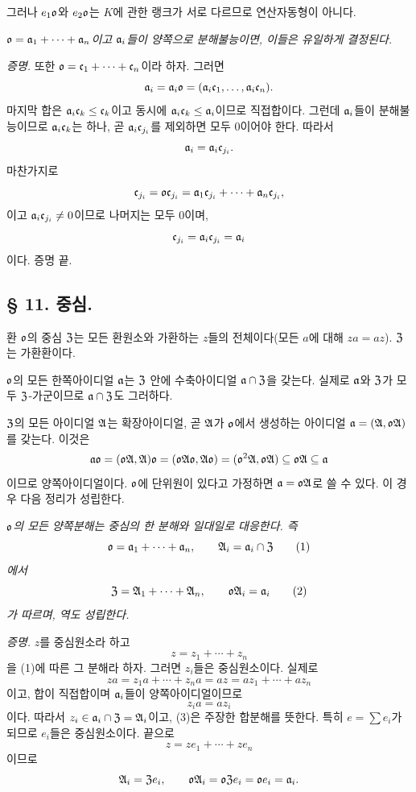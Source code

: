 그러나 \(e_1\mathfrak o\)와 \(e_2\mathfrak o\)는 \(K\)에 관한 랭크가 서로 다르므로 연산자동형이 아니다.

\emph{\(\mathfrak o=\mathfrak{a}_1+\cdots+\mathfrak{a}_n\)이고 \(\mathfrak{a}_i\)들이 양쪽으로 분해불능이면, 이들은 유일하게 결정된다.}

\emph{증명.} 또한 \(\mathfrak o=\mathfrak c_1+\cdots+\mathfrak c_n\)이라 하자. 그러면
\[
        \mathfrak{a}_i=\mathfrak{a}_i\mathfrak o=(\mathfrak{a}_i\mathfrak c_1,\ldots,\mathfrak{a}_i\mathfrak c_n).
\]
마지막 합은 \(\mathfrak{a}_i\mathfrak c_k\leq\mathfrak c_k\)이고 동시에 \(\mathfrak{a}_i\mathfrak c_k\leq\mathfrak{a}_i\)이므로 직접합이다. 그런데 \(\mathfrak{a}_i\)들이 분해불능이므로 \(\mathfrak{a}_i\mathfrak c_k\)는 하나, 곧 \(\mathfrak{a}_i\mathfrak c_{j_i}\)를 제외하면 모두 0이어야 한다. 따라서
\[
        \mathfrak{a}_i=\mathfrak{a}_i\mathfrak c_{j_i}.
\]
마찬가지로
\[
        \mathfrak c_{j_i}=\mathfrak o\mathfrak c_{j_i}
        =\mathfrak{a}_1\mathfrak c_{j_i}+\cdots+\mathfrak{a}_n\mathfrak c_{j_i},
\]
이고 \(\mathfrak{a}_i\mathfrak c_{j_i}\ne0\)이므로 나머지는 모두 0이며,
\[
        \mathfrak c_{j_i}=\mathfrak{a}_i\mathfrak c_{j_i}=\mathfrak{a}_i
\]
이다. 증명 끝.

\subsection*{§ 11. 중심.}

환 \(\mathfrak o\)의 중심 \(\mathfrak Z\)는 모든 환원소와 가환하는 \(z\)들의 전체이다(모든 \(a\)에 대해 \(za=az\)). \(\mathfrak Z\)는 가환환이다.

\(\mathfrak o\)의 모든 한쪽아이디얼 \(\mathfrak{a}\)는 \(\mathfrak Z\) 안에 \glqq{}수축아이디얼\grqq{} \(\mathfrak{a}\cap\mathfrak Z\)을 갖는다. 실제로 \(\mathfrak{a}\)와 \(\mathfrak Z\)가 모두 \(\mathfrak Z\)-가군이므로 \(\mathfrak{a}\cap\mathfrak Z\)도 그러하다.

\(\mathfrak Z\)의 모든 아이디얼 \(\mathfrak A\)는 확장아이디얼, 곧 \(\mathfrak A\)가 \(\mathfrak o\)에서 생성하는 아이디얼 \(\mathfrak{a}=(\mathfrak A,\mathfrak o\mathfrak A)\)를 갖는다. 이것은
\[
        \mathfrak{a}\mathfrak o=(\mathfrak o\mathfrak A,\mathfrak A)\mathfrak o=(\mathfrak o\mathfrak A\mathfrak o,\mathfrak A\mathfrak o)
        =(\mathfrak o^2\mathfrak A,\mathfrak o\mathfrak A)\subseteq\mathfrak o\mathfrak A\subseteq\mathfrak{a}
\]
이므로 양쪽아이디얼이다. \(\mathfrak o\)에 단위원이 있다고 가정하면 \(\mathfrak{a}=\mathfrak o\mathfrak A\)로 쓸 수 있다. 이 경우 다음 정리가 성립한다.

\emph{\(\mathfrak o\)의 모든 양쪽분해는 중심의 한 분해와 일대일로 대응한다. 즉}
\begin{equation}
        \mathfrak o=\mathfrak{a}_1+\cdots+\mathfrak{a}_n,
        \qquad \mathfrak A_i=\mathfrak{a}_i\cap\mathfrak Z                         \tag{1}
\end{equation}
\emph{에서}
\begin{equation}
        \mathfrak Z=\mathfrak A_1+\cdots+\mathfrak A_n,
        \qquad \mathfrak o\mathfrak A_i=\mathfrak{a}_i                              \tag{2}
\end{equation}
\emph{가 따르며, 역도 성립한다.}

\emph{증명.} \(z\)를 중심원소라 하고
\begin{equation}
        z=z_1+\cdots+z_n                                    \tag{3}
\end{equation}
을 (1)에 따른 그 분해라 하자. 그러면 \(z_i\)들은 중심원소이다. 실제로
\[
        za=z_1a+\cdots+z_na=az=az_1+\cdots+az_n
\]
이고, 합이 직접합이며 \(\mathfrak{a}_i\)들이 양쪽아이디얼이므로
\[
        z_i a=az_i
\]
이다. 따라서 \(z_i\in\mathfrak{a}_i\cap\mathfrak Z=\mathfrak A_i\)이고, (3)은 주장한 합분해를 뜻한다. 특히 \(e=\sum e_i\)가 되므로 \(e_i\)들은 중심원소이다. 끝으로
\[
        z=ze_1+\cdots+ze_n
\]
이므로
\[
        \mathfrak A_i=\mathfrak Z e_i,
        \qquad
        \mathfrak o\mathfrak A_i=\mathfrak o\mathfrak Z e_i=\mathfrak o e_i=\mathfrak{a}_i.
\]

